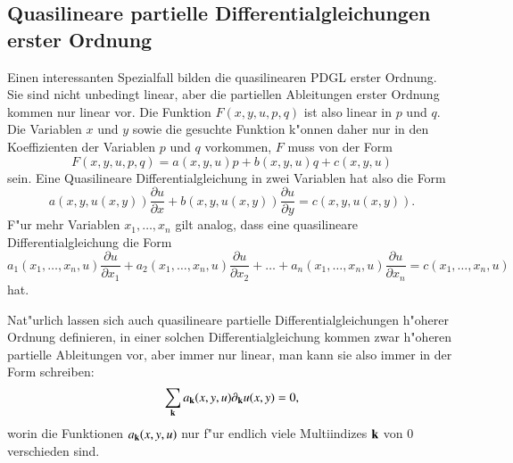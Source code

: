 \subsection{Quasilineare partielle Differentialgleichungen erster Ordnung\label{klassifikation:quasilinear}}
Einen interessanten Spezialfall bilden die quasilinearen PDGL erster
Ordnung. Sie sind nicht unbedingt linear, aber die partiellen
Ableitungen erster Ordnung kommen nur linear vor. Die Funktion
$
F(x,y,u,p,q)
$
ist also linear in $p$ und $q$. Die Variablen $x$ und $y$ sowie die
gesuchte Funktion k"onnen daher nur in den Koeffizienten der
Variablen $p$ und $q$ vorkommen, $F$ muss von der Form
\[
F(x,y,u,p,q)=a(x,y,u)p+b(x,y,u)q+c(x,y,u)
\]
sein. Eine Quasilineare Differentialgleichung in zwei Variablen
hat also die Form
\[
a(x,y,u(x,y))\frac{\partial u}{\partial x}+b(x,y,u(x,y))\frac{\partial u}{\partial y}
=c(x,y,u(x,y)).
\]
F"ur mehr Variablen $x_1,\dots,x_n$ gilt analog, dass eine quasilineare
Differentialgleichung die Form
\[
a_1(x_1,\dots,x_n,u)\frac{\partial u}{\partial x_1}
+
a_2(x_1,\dots,x_n,u)\frac{\partial u}{\partial x_2}
+\dots
+
a_n(x_1,\dots,x_n,u)\frac{\partial u}{\partial x_n}
=c(x_1,\dots,x_n,u)
\]
hat.

Nat"urlich lassen sich auch quasilineare partielle Differentialgleichungen
h"oherer Ordnung definieren, in einer solchen Differentialgleichung
kommen zwar h"oheren partielle Ableitungen vor, aber immer nur linear,
man kann sie also immer in der Form schreiben:
\[
\sum_{\bf k} a_{\bf k}(x,y,u)\partial_{\bf k} u(x,y) = 0,
\]
worin die Funktionen $a_{\bf k}(x,y,u)$ nur f"ur endlich viele
Multiindizes ${\bf k}$ von $0$ verschieden sind.

